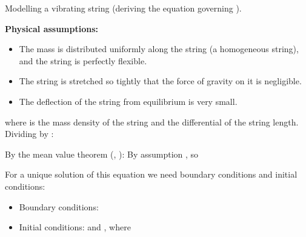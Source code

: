 Modelling a vibrating string (deriving the equation governing ).

\textbf{Physical assumptions:}

\begin{itemize}
\tightlist
\item
  The mass is distributed uniformly along the string (a homogeneous string), and the string is perfectly flexible.
\item
  The string is stretched so tightly that the force of gravity on it is negligible.
\item
  The deflection of the string from equilibrium is very small.
\end{itemize}


where \EMim{\rho} is the mass density of the string and  the differential of the string length. Dividing by :

By the mean value theorem (, ):
By assumption , so

For a unique solution of this equation we need boundary conditions and initial conditions:

\begin{itemize}
\tightlist
\item
  Boundary conditions: 
\item
  Initial conditions:  and , where 
\end{itemize}

